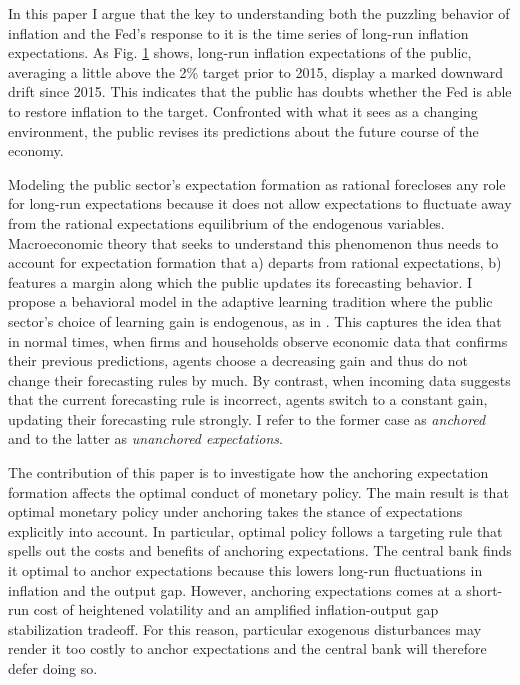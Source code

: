 \documentclass[11pt]{article}
\def \myFigPath {../../figures/}
\renewcommand{\[}{\begin{equation}}
\renewcommand{\]}{\end{equation}}
\def\mySmallFigScale{0.22}
\begin{document}
In this paper I argue that the key to understanding both the puzzling behavior of inflation and the Fed's response to it is the time series of long-run inflation expectations. As Fig. \ref{epi} shows, long-run inflation expectations of the public, averaging a little above the 2\% target prior to 2015, display a marked downward drift since 2015. This indicates that the public has doubts whether the Fed is able to restore inflation to the target. Confronted with what it sees as a changing environment, the public revises its predictions about the future course of the economy.

\begin{figure}[h!]
\caption{}
\label{epi}
\end{figure}

Modeling the public sector's expectation formation as rational forecloses any role for long-run expectations because it does not allow expectations to fluctuate away from the rational expectations equilibrium of the endogenous variables. Macroeconomic theory that seeks to understand this phenomenon thus needs to account for expectation formation that a) departs from rational expectations, b) features a margin along which the public updates its forecasting behavior. I propose a behavioral model in the adaptive learning tradition where the public sector's choice of learning gain is endogenous, as in \cite{carvalho2019anchored}. This captures the idea that in normal times, when firms and households observe economic data that confirms their previous predictions, agents choose a decreasing gain and thus do not change their forecasting rules by much. By contrast, when incoming data suggests that the current forecasting rule is incorrect, agents switch to a constant gain, updating their forecasting rule strongly. I refer to the former case as \emph{anchored} and to the latter as \emph{unanchored expectations}.

The contribution of this paper is to investigate how the anchoring expectation formation affects the optimal conduct of monetary policy. The main result is that optimal monetary policy under anchoring takes the stance of expectations explicitly into account. In particular, optimal policy follows a targeting rule that spells out the costs and benefits of anchoring expectations. The central bank finds it optimal to anchor expectations because this lowers long-run fluctuations in inflation and the output gap. However, anchoring expectations comes at a short-run cost of heightened volatility and an amplified inflation-output gap stabilization tradeoff. For this reason, particular exogenous disturbances may render it too costly to anchor expectations and the central bank will therefore defer doing so.
\end{document}
